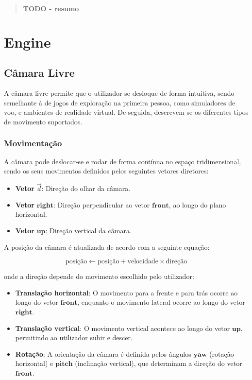 \documentclass[12pt, a4paper]{article}
\begin{document}
\pagebreak

\begin{abstract}
    \textbf{\color{red} TODO - resumo}
\end{abstract}

\section{Engine}

\subsection{Câmara Livre}

A câmara livre permite que o utilizador se desloque de forma intuitiva, sendo semelhante à de
jogos de exploração na primeira pessoa, como simuladores de voo, e ambientes de realidade
virtual.
De seguida, descrevem-se os diferentes tipos de movimento suportados.

\subsubsection{Movimentação}

A câmara pode deslocar-se e rodar de forma contínua no espaço tridimensional, sendo os seus
movimentos definidos pelos seguintes vetores diretores:

\begin{itemize}
    \item \textbf{Vetor} $\vec d$: Direção do olhar da câmara.
    \item \textbf{Vetor} $\mathbf{right}$: Direção perpendicular ao vetor $\mathbf{front}$, ao
          longo do plano horizontal.
    \item \textbf{Vetor} $\mathbf{up}$: Direção vertical da câmara.
\end{itemize}

A posição da câmara é atualizada de acordo com a seguinte equação:

\[
\text{posição} \gets \text{posição} + \text{velocidade} \times \text{direção}
\]

onde a direção depende do movimento escolhido pelo utilizador:

\begin{itemize}
    \item \textbf{Translação horizontal}: O movimento para a frente e para trás ocorre ao longo
          do vetor $\mathbf{front}$, enquanto o movimento lateral ocorre ao longo do vetor
          $\mathbf{right}$.
    \item \textbf{Translação vertical}: O movimento vertical acontece ao longo do vetor
          $\mathbf{up}$, permitindo ao utilizador subir e descer.
    \item \textbf{Rotação}: A orientação da câmara é definida pelos ângulos $\mathbf{yaw}$
          (rotação horizontal) e $\mathbf{pitch}$ (inclinação vertical), que determinam a direção
          do vetor $\mathbf{front}$.
\end{itemize}
\end{document}
